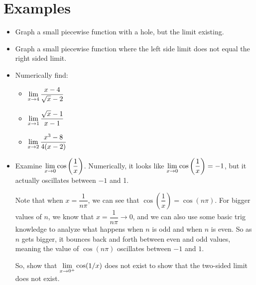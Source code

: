 \section*{Examples}

\begin{itemize}
  \item Graph a small piecewise function with a hole, but the limit existing.
  \item Graph a small piecewise function where the left side limit does not equal the right sided limit.
  \item Numerically find:
    \begin{itemize}
      \item $\displaystyle \lim_{x\to 4} \dfrac{x-4}{\sqrt{x}-2}$
      \item $\displaystyle \lim_{x\to 1} \dfrac{\sqrt{x}-1}{x-1}$
      \item $\displaystyle \lim_{x\to 2} \dfrac{x^3-8}{4(x-2)}$
    \end{itemize}
  \item Examine $\displaystyle \lim_{x\to 0} \cos\left(\dfrac{1}{x}\right)$.
  Numerically, it looks like $\displaystyle \lim_{x\to 0} \cos\left(\dfrac{1}{x}\right)=-1$, but it actually oscillates between $-1$ and 1.

  Note that when $x=\dfrac{1}{n\pi}$, we can see that  $\cos\left(\dfrac{1}{x}\right)=\cos(n\pi)$.
  For bigger values of $n$, we know that $x=\dfrac{1}{n\pi} \to 0$, and we can also use some basic trig knowledge to analyze what happens when $n$ is odd and when $n$ is even.
  So as $n$ gets bigger, it bounces back and forth between even and odd values, meaning the value of $\cos(n\pi)$ oscillates between $-1$ and $1$.

  So, show that $\displaystyle \lim_{x\to0^+}\cos(1/x)$ does not exist to show that the two-sided limit does not exist.
\end{itemize}
